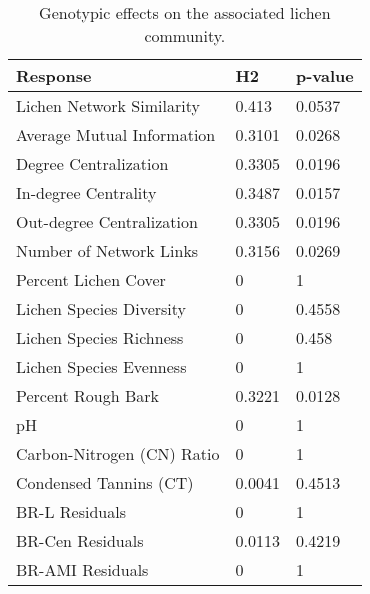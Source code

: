 \begin{table}[ht]
\centering
\begin{tabular}{lll}
  \hline
Response & H2 & p-value \\ 
  \hline
Lichen Network Similarity & 0.413 & 0.0537 \\ 
  Average Mutual Information & 0.3101 & 0.0268 \\ 
  Degree Centralization & 0.3305 & 0.0196 \\ 
  In-degree Centrality & 0.3487 & 0.0157 \\ 
  Out-degree Centralization & 0.3305 & 0.0196 \\ 
  Number of Network Links & 0.3156 & 0.0269 \\ 
  Percent Lichen Cover & 0 & 1 \\ 
  Lichen Species Diversity & 0 & 0.4558 \\ 
  Lichen Species Richness & 0 & 0.458 \\ 
  Lichen Species Evenness & 0 & 1 \\ 
  Percent Rough Bark & 0.3221 & 0.0128 \\ 
  pH & 0 & 1 \\ 
  Carbon-Nitrogen (CN) Ratio & 0 & 1 \\ 
  Condensed Tannins (CT) & 0.0041 & 0.4513 \\ 
  BR-L Residuals & 0 & 1 \\ 
  BR-Cen Residuals & 0.0113 & 0.4219 \\ 
  BR-AMI Residuals & 0 & 1 \\ 
   \hline
\end{tabular}
\caption{Genotypic effects on the associated lichen community.} 
\label{tab:h2_table}
\end{table}
